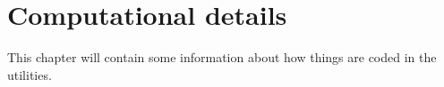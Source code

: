 \chapter{Computational details} \label{chap:ReadData}

This chapter will contain some information about how things are coded in
the utilities.



